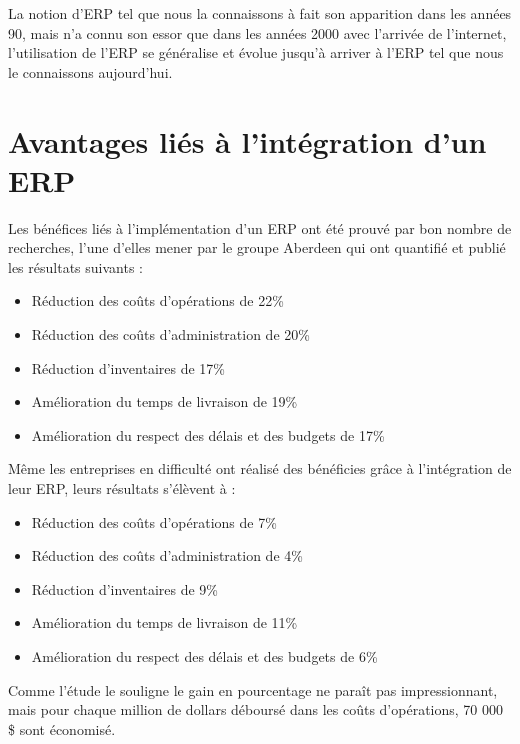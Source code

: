 La notion d’\acs{ERP} tel que nous la connaissons à fait son apparition dans les années 90, mais n’a connu son essor que dans les années 2000 avec l’arrivée de l’internet, l’utilisation de l’\acs{ERP} se généralise et évolue jusqu’à arriver à l’\acs{ERP} tel que nous le connaissons aujourd’hui.

\section{Avantages liés à l’intégration d’un \acs{ERP}}
Les bénéfices liés à l’implémentation d’un ERP ont été prouvé par bon nombre de recherches, l’une d’elles mener par le groupe Aberdeen qui ont quantifié et publié les résultats suivants :\\

\begin{itemize}
    \item Réduction des coûts d’opérations de 22\%
    \item Réduction des coûts d’administration de 20\%
    \item Réduction d’inventaires de 17\%
    \item Amélioration du temps de livraison de 19\%
    \item Amélioration du respect des délais et des budgets de 17\%\\
\end{itemize}

Même les entreprises en difficulté ont réalisé des bénéficies grâce à l’intégration de leur ERP, leurs résultats s’élèvent à :\\

\begin{itemize}
    \item Réduction des coûts d’opérations de 7\%
    \item Réduction des coûts d’administration de 4\%
    \item Réduction d’inventaires de 9\%
    \item Amélioration du temps de livraison de 11\%
    \item Amélioration du respect des délais et des budgets de 6\%\\
\end{itemize}

Comme l’étude le souligne le gain en pourcentage ne paraît pas impressionnant, mais pour chaque million de dollars déboursé dans les coûts d’opérations, 70 000 \$ sont économisé.\\


